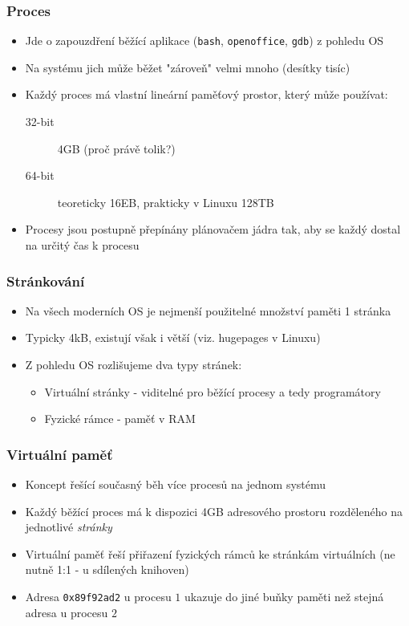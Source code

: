 \documentclass[professionalfonts,svgnames]{beamer}
\begin{document}
\begin{frame}
\frametitle{Proces}
\begin{itemize}
\item Jde o zapouzdření běžící aplikace (\texttt{bash}, \texttt{openoffice}, \texttt{gdb}) z pohledu OS
\item Na systému jich může běžet "zároveň" velmi mnoho (desítky tisíc)
\item Každý proces má vlastní lineární paměťový prostor, který může používat:
	\begin{description}
		\item [32-bit] 4GB (proč právě tolik?)
		\item [64-bit] teoreticky 16EB, prakticky v Linuxu 128TB
	\end{description}
\item Procesy jsou postupně přepínány plánovačem jádra tak, aby se každý dostal na určitý čas k procesu
\end{itemize}
\end{frame}

 \begin{frame}
\frametitle{Stránkování}
\begin{itemize}
\item Na všech moderních OS je nejmenší použitelné množství paměti 1 stránka
\item Typicky 4kB, existují však i větší (viz. hugepages v Linuxu)
\item Z pohledu OS rozlišujeme dva typy stránek:
	\begin{itemize}
		\item Virtuální stránky - viditelné pro běžící procesy a tedy programátory
		\item Fyzické rámce - paměť v RAM
	\end{itemize}
\end{itemize}
\end{frame}

\begin{frame}
\frametitle{Virtuální paměť}
\begin{itemize}
\item Koncept řešící současný běh více procesů na jednom systému
\item Každý běžící proces má k dispozici 4GB adresového prostoru rozděleného na jednotlivé \textit{stránky}
\item Virtuální paměť řeší přiřazení fyzických rámců ke stránkám virtuálních (ne nutně 1:1 - u sdílených knihoven)
\item Adresa \texttt{0x89f92ad2} u procesu $1$ ukazuje do jiné buňky paměti než stejná adresa u procesu $2$
\end{itemize}
\end{frame}
\end{document}

